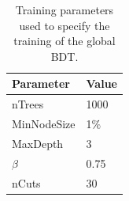 \begin{table}[htbp]
\begin{center}
\begin{tabular}{ll}
\hline
Parameter & Value \\ \hline
nTrees & 1000 \\
MinNodeSize & 1$\%$ \\
MaxDepth & 3 \\
$\beta$ & 0.75 \\
nCuts & 30 \\
\hline
\end{tabular}
\vspace{0.7cm}
\caption{Training parameters used to specify the training of the global BDT.}
\label{tab:BDTtrainingparams}
\end{center}
\vspace{-1.0cm}
\end{table}



